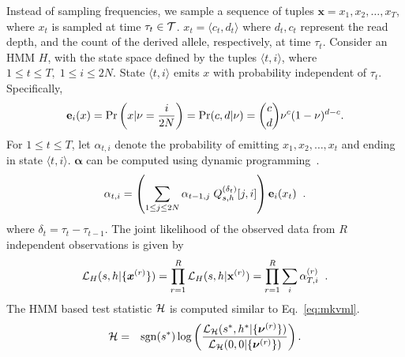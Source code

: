 \documentclass[11pt]{article}
\def\comale{\text{COMALE }}
\begin{document}
Instead of sampling frequencies, we sample a sequence of tuples
$\mathbf{x}=x_1,x_2,\ldots,x_T$, where $x_t$ is sampled at time
$\tau_t\in {\cal T}$. $x_t = \langle c_t,d_t \rangle$ where $d_t, c_t$
represent the read depth, and the count of the derived allele,
respectively, at time $\tau_t$. Consider an HMM $H$, with the state
space defined by the tuples $\langle t, i\rangle$, where $1\leq t\leq
T,\; 1\le i\le 2N$. State $\langle t, i\rangle$ emits $x$ with
probability independent of $\tau_t$. Specifically,
\begin{equation*}
{\bf e}_{i}(x)=\operatorname{Pr}\left (x|\nu=\frac{i}{2N}\right)=\operatorname{Pr}(c,d|\nu) 
        = {c \choose d} \nu^c(1-\nu)^{d-c}.
\end{equation*}
For $1\le t\le T$, let $\alpha_{t,i}$ denote the probability of
emitting $x_1,x_2,\ldots,x_t$ and ending in state $\langle t,
i\rangle$. $\bm{\alpha}$ can be computed using dynamic
programming~\cite{XXX}.
\begin{equation}
  \alpha_{t,i} = \left( \sum_{1\le j\le 2N} \alpha_{t-1,j}\;Q^{(\delta_t)}_{s,h}[j,i] \right) {\bf e}_{i}(x_t)\;\; .
  \label{eq:hmm}
\end{equation}
where $\delta_t=\tau_t-\tau_{t-1}$. The joint likelihood of the
observed data from $R$ independent observations is given by
\begin{equation}
  {\cal L}_{H}(s,h|\{\bm{x}^{(r)}\})=\prod_{r=1}^R{\cal L}_{H}(s,h|\mathbf{x}^{(r)}) = \prod_{r=1}^R \sum_i\alpha_{T,i}^{(r)}\;\;.
  \label{eq:hmmlik}
\end{equation}
The HMM based \comale test statistic ${\cal H}$ is computed similar to Eq.~\ref{eq:mkvml}.
\begin{eqnarray}
{\cal H} &=& \operatorname{sgn}(s^*)\log 
\left(\frac{{\cal L}_{\cal H}(s^*,h^*|\{\bm{\nu}^{(r)}\})}{{\cal L}_{\cal H}(0,0|\{\bm{\nu}^{(r)}\})}\right).
\label{eq:hmmml}
\end{eqnarray}
\end{document}
